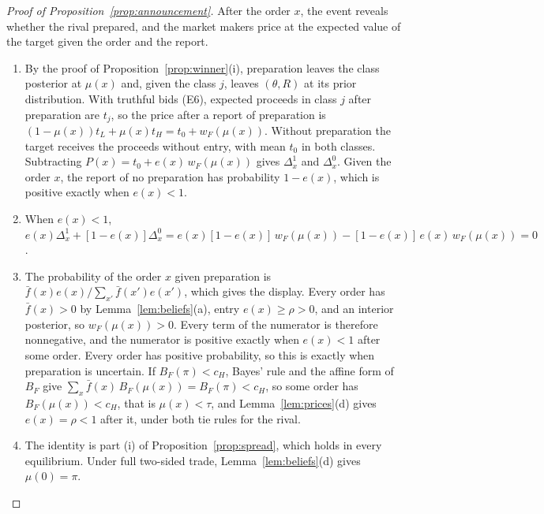 \begin{proof}[Proof of Proposition~\ref{prop:announcement}]
After the order \(x\), the event reveals whether the rival prepared, and the market makers price at the expected
value of the target given the order and the report.
\begin{enumerate}[label=(\roman*),leftmargin=2em]
\item By the proof of Proposition~\ref{prop:winner}(i), preparation leaves the class posterior at \(\mu(x)\) and, given
the class \(j\), leaves \((\theta,R)\) at its prior distribution. With truthful bids (E6), expected proceeds in class \(j\) after
preparation are \(t_j\), so the price after a report of preparation is \((1-\mu(x))t_L+\mu(x)t_H=t_0+w_F(\mu(x))\).
Without preparation the target receives the proceeds without entry, with mean \(t_0\) in both classes. Subtracting
\(P(x)=t_0+e(x)\,w_F(\mu(x))\) gives \(\Delta^1_x\) and \(\Delta^0_x\). Given the order \(x\), the report of no
preparation has probability \(1-e(x)\), which is positive exactly when \(e(x)<1\).
\item When \(e(x)<1\), \(e(x)\Delta^1_x+[1-e(x)]\Delta^0_x=e(x)[1-e(x)]\,w_F(\mu(x))-[1-e(x)]\,e(x)\,w_F(\mu(x))=0\).
\item The probability of the order \(x\) given preparation is \(\bar f(x)e(x)/\sum_{x'}\bar f(x')e(x')\), which gives the
display. Every order has \(\bar f(x)>0\) by Lemma~\ref{lem:beliefs}(a), entry \(e(x)\ge\rho>0\), and an interior
posterior, so \(w_F(\mu(x))>0\). Every term of the numerator is therefore nonnegative, and the numerator is positive
exactly when \(e(x)<1\) after some order. Every order has positive probability, so this is exactly when preparation
is uncertain. If \(B_F(\pi)<c_H\), Bayes' rule and the affine form of \(B_F\) give
\(\sum_x\bar f(x)\,B_F(\mu(x))=B_F(\pi)<c_H\), so some order has \(B_F(\mu(x))<c_H\), that is \(\mu(x)<\tau\), and
Lemma~\ref{lem:prices}(d) gives \(e(x)=\rho<1\) after it, under both tie rules for the rival.
\item The identity is part (i) of Proposition~\ref{prop:spread}, which holds in every equilibrium. Under full
two-sided trade, Lemma~\ref{lem:beliefs}(d) gives \(\mu(0)=\pi\).\qedhere
\end{enumerate}
\end{proof}

